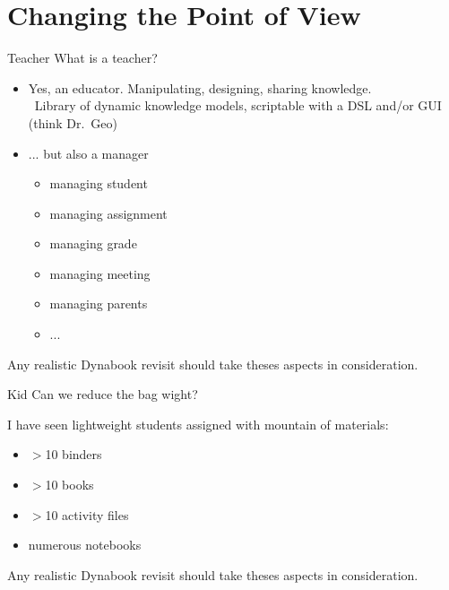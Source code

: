\documentclass{beamer}
\newcommand{\tip}{\boldmath{\textcolor{red}{$\Rightarrow$}}}
\newcommand{\drgeo}{Dr.~Geo}
\begin{document}
\section{Changing the Point of View}
\begin{frame}{Teacher}
  What is a teacher?
  \vspace*{10pt}
  \begin{itemize}
  \item Yes, an educator. Manipulating, designing, sharing knowledge.\\
    \tip\ Library of dynamic knowledge models, scriptable with a DSL
    and/or GUI (think \drgeo)

  \item ... but also a manager
    \begin{itemize}
    \item managing student
    \item managing assignment
    \item managing grade
    \item managing meeting
    \item managing parents
    \item ...
    \end{itemize}
  \end{itemize}
  \vspace*{10pt}

  Any realistic Dynabook revisit should take theses aspects in
  consideration.
\end{frame}
%
\begin{frame}{Kid}
  Can we reduce the bag wight?

  \vspace*{10pt}

  I have seen lightweight students assigned with mountain of materials:
  \begin{itemize}
  \item $>$10 binders
  \item $>$10 books
  \item $>$10 activity files
  \item numerous notebooks
  \end{itemize}

  \vspace*{10pt}
  
  Any realistic Dynabook revisit should take theses aspects in
  consideration.

\end{frame}
%
\end{document}
